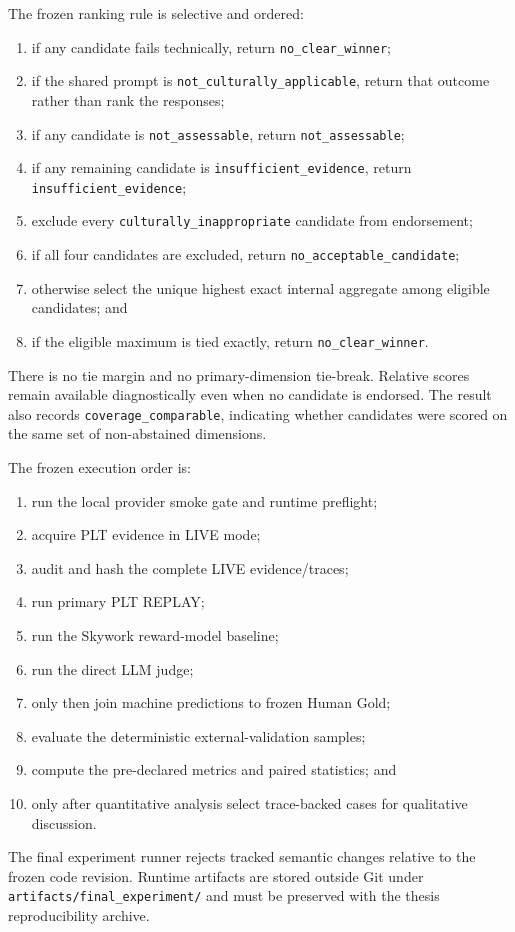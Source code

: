 The frozen ranking rule is selective and ordered:
\begin{enumerate}
    \item if any candidate fails technically, return \texttt{no\_clear\_winner};
    \item if the shared prompt is \texttt{not\_culturally\_applicable}, return that outcome rather than rank the responses;
    \item if any candidate is \texttt{not\_assessable}, return \texttt{not\_assessable};
    \item if any remaining candidate is \texttt{insufficient\_evidence}, return \texttt{insufficient\_evidence};
    \item exclude every \texttt{culturally\_inappropriate} candidate from endorsement;
    \item if all four candidates are excluded, return \texttt{no\_acceptable\_candidate};
    \item otherwise select the unique highest exact internal aggregate among eligible candidates; and
    \item if the eligible maximum is tied exactly, return \texttt{no\_clear\_winner}.
\end{enumerate}

There is no tie margin and no primary-dimension tie-break. Relative scores remain available diagnostically even when no candidate is endorsed. The result also records \texttt{coverage\_comparable}, indicating whether candidates were scored on the same set of non-abstained dimensions.

The frozen execution order is:
\begin{enumerate}
    \item run the local provider smoke gate and runtime preflight;
    \item acquire PLT evidence in LIVE mode;
    \item audit and hash the complete LIVE evidence/traces;
    \item run primary PLT REPLAY;
    \item run the Skywork reward-model baseline;
    \item run the direct LLM judge;
    \item only then join machine predictions to frozen Human Gold;
    \item evaluate the deterministic external-validation samples;
    \item compute the pre-declared metrics and paired statistics; and
    \item only after quantitative analysis select trace-backed cases for qualitative discussion.
\end{enumerate}

The final experiment runner rejects tracked semantic changes relative to the frozen code revision. Runtime artifacts are stored outside Git under \texttt{artifacts/final\_experiment/} and must be preserved with the thesis reproducibility archive.
